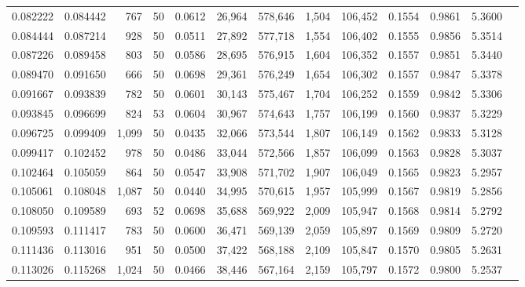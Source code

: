\begin{tabular}{rrrrrrrrrrrrr}
0.082222 & 0.084442 &   767 &  50 &                                     0.0612 &  26,964 & 578,646 &   1,504 & 106,452 & 0.1554 & 0.9861 & 5.3600 \\
0.084444 & 0.087214 &   928 &  50 &                                     0.0511 &  27,892 & 577,718 &   1,554 & 106,402 & 0.1555 & 0.9856 & 5.3514 \\
0.087226 & 0.089458 &   803 &  50 &                                     0.0586 &  28,695 & 576,915 &   1,604 & 106,352 & 0.1557 & 0.9851 & 5.3440 \\
0.089470 & 0.091650 &   666 &  50 &                                     0.0698 &  29,361 & 576,249 &   1,654 & 106,302 & 0.1557 & 0.9847 & 5.3378 \\
0.091667 & 0.093839 &   782 &  50 &                                     0.0601 &  30,143 & 575,467 &   1,704 & 106,252 & 0.1559 & 0.9842 & 5.3306 \\
0.093845 & 0.096699 &   824 &  53 &                                     0.0604 &  30,967 & 574,643 &   1,757 & 106,199 & 0.1560 & 0.9837 & 5.3229 \\
0.096725 & 0.099409 & 1,099 &  50 &                                     0.0435 &  32,066 & 573,544 &   1,807 & 106,149 & 0.1562 & 0.9833 & 5.3128 \\
0.099417 & 0.102452 &   978 &  50 &                                     0.0486 &  33,044 & 572,566 &   1,857 & 106,099 & 0.1563 & 0.9828 & 5.3037 \\
0.102464 & 0.105059 &   864 &  50 &                                     0.0547 &  33,908 & 571,702 &   1,907 & 106,049 & 0.1565 & 0.9823 & 5.2957 \\
0.105061 & 0.108048 & 1,087 &  50 &                                     0.0440 &  34,995 & 570,615 &   1,957 & 105,999 & 0.1567 & 0.9819 & 5.2856 \\
0.108050 & 0.109589 &   693 &  52 &                                     0.0698 &  35,688 & 569,922 &   2,009 & 105,947 & 0.1568 & 0.9814 & 5.2792 \\
0.109593 & 0.111417 &   783 &  50 &                                     0.0600 &  36,471 & 569,139 &   2,059 & 105,897 & 0.1569 & 0.9809 & 5.2720 \\
0.111436 & 0.113016 &   951 &  50 &                                     0.0500 &  37,422 & 568,188 &   2,109 & 105,847 & 0.1570 & 0.9805 & 5.2631 \\
0.113026 & 0.115268 & 1,024 &  50 &                                     0.0466 &  38,446 & 567,164 &   2,159 & 105,797 & 0.1572 & 0.9800 & 5.2537 \\

\end{tabular}
